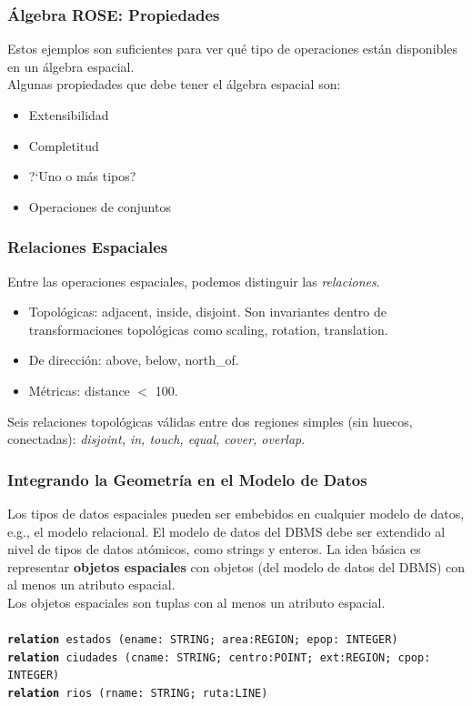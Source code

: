 \documentclass[a4paper,12pt,oneside]{report}
\begin{document}
\subsubsection*{\'Algebra ROSE: Propiedades}
Estos ejemplos son suficientes para ver qu\'e tipo de operaciones est\'an disponibles en un \'algebra espacial.\\
Algunas propiedades que debe tener el \'algebra espacial son:
\begin{itemize}
\item Extensibilidad
\item Completitud
\item ?`Uno o m\'as tipos?
\item Operaciones de conjuntos
\end{itemize}

\subsubsection*{Relaciones Espaciales}
Entre las operaciones espaciales, podemos distinguir las \textit{relaciones}.
\begin{itemize}
\item Topol\'ogicas: adjacent, inside, disjoint. Son invariantes dentro de transformaciones topol\'ogicas como scaling, rotation, translation.
\item De direcci\'on: above, below, north\_of.
\item M\'etricas: distance $<$ 100.
\end{itemize}
Seis relaciones topol\'ogicas v\'alidas entre dos regiones simples (sin huecos, conectadas): \textit{disjoint, in, touch, equal, cover, overlap}.

\subsubsection*{Integrando la Geometr\'ia en el Modelo de Datos}
Los tipos de datos espaciales pueden ser embebidos en cualquier modelo de datos, e.g., el modelo relacional. El modelo de datos del DBMS debe ser extendido al nivel de tipos de datos at\'omicos, como strings y enteros.
La idea b\'asica es representar \textbf{objetos espaciales} con objetos (del modelo de datos del DBMS) con al menos un atributo espacial.\\
Los objetos espaciales son tuplas con al menos un atributo espacial.\\
\ \\
\texttt{\textbf{relation} estados (ename: STRING; area:REGION; epop: INTEGER)}\\
\texttt{\textbf{relation} ciudades (cname: STRING; centro:POINT; ext:REGION; cpop: INTEGER)}\\
\texttt{\textbf{relation} rios (rname: STRING; ruta:LINE)}
\end{document}
